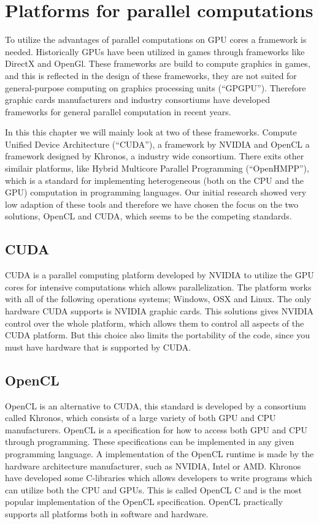 \section{Platforms for parallel computations}
To utilize the advantages of parallel computations on GPU cores a framework is needed.
Historically GPUs have been utilized in games through frameworks like DirectX and OpenGl.
These frameworks are build to compute graphics in games, and this is reflected in the design of these frameworks, they are not suited for general-purpose computing on graphics processing units (``GPGPU'').
Therefore graphic cards manufacturers and industry consortiums have developed frameworks for general parallel computation in recent years.

In this this chapter we will mainly look at two of these frameworks.
Compute Unified Device Architecture (``CUDA''), a framework by NVIDIA and OpenCL a framework designed by Khronos, a industry wide consortium.\citep{CUDA, OpenCL}
There exits other similair platforms, like Hybrid Multicore Parallel Programming (``OpenHMPP''), which is a standard for implementing heterogeneous (both on the CPU and the GPU) computation in programming languages. 
Our initial research showed very low adaption of these tools and therefore we have chosen the focus on the two solutions, OpenCL and CUDA, which seems to be the competing standards. 

\subsection{CUDA}\label{sec:opencl}
CUDA is a parallel computing platform developed by NVIDIA to utilize the GPU cores for intensive computations which allows parallelization.
The platform works with all of the following operations systems; Windows, OSX and Linux.
The only hardware CUDA supports is NVIDIA graphic cards. 
This solutions gives NVIDIA control over the whole platform, which allows them to control all aspects of the CUDA platform.
But this choice also limits the portability of the code, since you must have hardware that is supported by CUDA. \citep{CUDAfaq}

\subsection{OpenCL}
OpenCL is an alternative to CUDA, this standard is developed by a consortium called Khronos, which consists of a large variety of both GPU and CPU manufacturers.
OpenCL is a specification for how to access both GPU and CPU through programming.
These specifications can be implemented in any given programming language.
A implementation of the OpenCL runtime is made by the hardware architecture manufacturer, such as NVIDIA, Intel or AMD. 
Khronos have developed some C-libraries which allows developers to write programs which can utilize both the CPU and GPUs.
This is called OpenCL C and is the most popular implementation of the OpenCL specification.
OpenCL practically supports all platforms both in software and hardware. 

